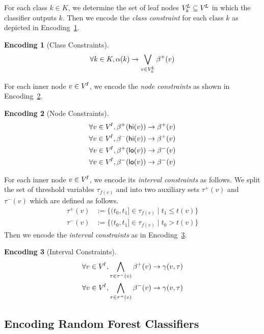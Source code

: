 \documentclass{easychair}
\DeclareMathOperator\hi{\ensuremath{\mathsf{hi}}}
\DeclareMathOperator\lo{\ensuremath{\mathsf{lo}}}
\theoremstyle{definition}
\newtheorem{encoding}{Encoding}[section]
\begin{document}
For each class $k \in K$, we determine the set of leaf nodes $V^{\!L}_k \subseteq V^{\!L}$ in which the classifier outputs $k$. 
Then we encode the \emph{class constraint} for each class $k$ as depicted in Encoding~\ref{enc:class}. 
%
\begin{encoding}[Class Constraints]
\label{enc:class}
\begin{align*}
\forall k \in K, \alpha(k) \rightarrow \bigvee\limits_{v \in V^{\!L}_k} \beta^+(v)
\end{align*}
\end{encoding}
%
For each inner node $v \in V^{\!I}$, we encode the \emph{node constraints} as shown in Encoding~\ref{enc:node}. 
%
\begin{encoding}[Node Constraints]
\label{enc:node}
\begin{align*}
\forall v \in \innernodes, \nodehv{\hi(v)} &\rightarrow \nodehv{v}\\ 
\forall v \in \innernodes, \nodelv{\hi(v)} &\rightarrow \nodehv{v}\\ 
\forall v \in \innernodes, \nodehv{\lo(v)} &\rightarrow \nodelv{v}\\ 
\forall v \in \innernodes, \nodelv{\lo(v)} &\rightarrow \nodelv{v}
\end{align*}
\end{encoding}
%
For each inner node $v \in V^{\!I}$, we encode its \emph{interval constraints} as follows. 
We split the set of threshold variables $\tau_{f(v)}$ and into two auxiliary sets $\tau^+(v)$ and $\tau^-(v)$ which are defined as follows. 
%
\begin{align*}
\tau^+(v) &:= \{ (t_0, t_1] \in \tau_{f(v)} \mid t_1 \leq t(v) \}\\
\tau^-(v) &:= \{ (t_0, t_1] \in \tau_{f(v)} \mid t_0 > t(v) \}
\end{align*}
%
Then we encode the \emph{interval constraints} as in Encoding~\ref{enc:inter}. 
%
\begin{encoding}[Interval Constraints]
\label{enc:inter}
\begin{align*}
\forall v \in V^{\!I}, \bigwedge\limits_{\tau \in \tau^-(v)} \beta^+(v) \rightarrow \gamma(v, \tau)\\
\forall v \in V^{\!I}, \bigwedge\limits_{\tau \in \tau^+(v)} \beta^-(v) \rightarrow \gamma(v, \tau)
\end{align*}
\end{encoding}


\subsection{Encoding Random Forest Classifiers}
\label{sec:approach:rf}
\end{document}
